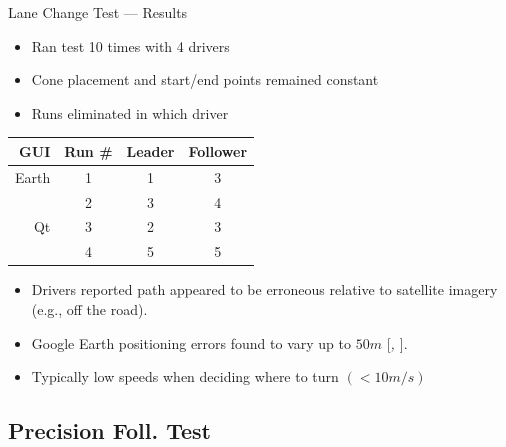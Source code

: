 \documentclass{beamer}
\newcommand{\citeitem}[1]{[\emph{\Citeauthor*{#1}, \citeyear{#1} }]}
\begin{document}
    \begin{frame}{Lane Change Test --- Results}
      \begin{itemize} \footnotesize
        \item Ran test 10 times with 4 drivers
        \item Cone placement and start/end points remained constant
        \item Runs eliminated in which driver 
      \end{itemize}
      \vspace{-10pt}
      \begin{table}[htbp] \centering \footnotesize
        \begin{tabular}{rc|cc}
          GUI&    Run \#  &     Leader&    Follower \\\hline\hline
          Earth&      1       &       1   &    3 \\
               &      2       &       3   &    4 \\ \hline
          Qt   &      3       &       2   &    3 \\
               &      4       &       5   &    5 \\ \hline   
        \end{tabular}
        \label{tab:lanechangeresults}
      \end{table}
      \begin{itemize} \footnotesize
        \item Drivers reported path appeared to be erroneous relative to satellite imagery (e.g., off the road).
        \item Google Earth positioning errors found to vary up to $50m$ \citeitem{ge_accuracy}.
        \item Typically low speeds when deciding where to turn $(<10m/s)$
      \end{itemize}
    \end{frame}



  \subsection{Precision Foll. Test}
\end{document}
